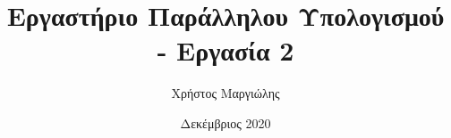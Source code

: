 \documentclass{article}
\title{Εργαστήριο Παράλληλου Υπολογισμού - Εργασία 2}
\author{Χρήστος Μαργιώλης}
\date{Δεκέμβριος 2020}
\begin{document}
\begin{titlepage}
        \maketitle
\end{titlepage}

\renewcommand{\contentsname}{Περιεχόμενα}
\tableofcontents
\end{document}
